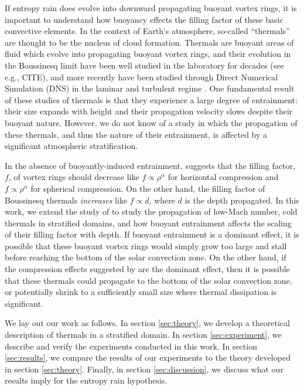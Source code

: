 \documentclass[twocolumn, amsmath, amsfonts, amssymb, trackchanges]{aastex62}
\begin{document}
If entropy rain does evolve into downward propagating buoyant vortex rings, it is
important to understand how buoyancy effects the filling factor of these basic
convective elements. In the context of Earth's atmosphere, so-called ``thermals''
are thought to be the nucleus of cloud formation. Thermals are buoyant areas
of fluid which evolve into propagating buoyant vortex rings, and their
evolution in the Boussinesq limit have been well studied in the laboratory
for decades (see e.g., CITE), and more recently have been studied through
Direct Numerical Simulation (DNS) in the laminar and turbulent regime
\citep{lecoanet&jeevanjee2018}. One fundamental result of these studies of
thermals is that they experience a large degree of entrainment: their size expands
with height and their propagation velocity slows despite their buoyant nature.
However, we do not know of a study in which the propagation of these thermals,
and thus the nature of their entrainment, is affected by a 
significant atmospheric stratification.

In the absence of buoyantly-induced entrainment, \citet{brandenburg2016}
suggests that the filling factor, $f$, of vortex rings should decrease like
$f \propto \rho^{\alpha}$ for horizontal compression and $f \propto \rho^{\alpha}$ for 
spherical compression. On the other hand, the filling factor of Boussinesq
thermals \emph{increases} like $f \propto d$, where $d$ is the depth propagated.
In this work, we extend the study of \citet{lecoanet&jeevanjee2018} to study
the propagation of low-Mach number, cold thermals in stratified domains, and how
buoyant entrainment affects the scaling of their filling factor with depth. If
buoyant entrainment is a dominant effect, it is possible that these buoyant vortex rings
would simply grow too large and stall before reaching the bottom of the solar convection zone.
On the other hand, if the compression effects suggested by \citet{brandenburg2016} are the
dominant effect, then it is possible that these thermals could propagate to the bottom of the solar
convection zone, or potentially shrink to a sufficiently small size where thermal dissipation is
significant.

We lay out our work as follows. In section \ref{sec:theory}, we develop a theoretical description
of thermals in a stratified domain. In section \ref{sec:experiment}, we describe and verify
the experiments conducted in this work. In section \ref{sec:results}, we compare the results
of our experiments to the theory developed in section \ref{sec:theory}. Finally, in section
\ref{sec:discussion}, we discuss what our results imply for the entropy rain hypothesis.
\end{document}
